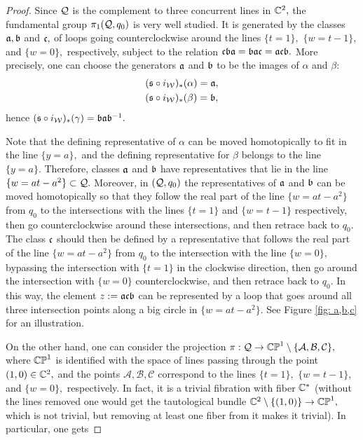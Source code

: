 \documentclass{article}
\begin{document}
\begin{proof}
Since $\mathcal{Q}$ is the complement to three concurrent lines in $\mathbb{C}^2,$ the fundamental group $\pi_1(\mathcal{Q},q_0)$ is very well studied. It is generated by the classes $\mathfrak{a},\mathfrak{b}$ and $\mathfrak{c},$ of loops going counterclockwise around the lines $\{t=1\},$ $\{w=t-1\},$ and $\{w=0\},$ respectively, subject to the relation $\mathfrak{c}\mathfrak{b}\mathfrak{a}=\mathfrak{b}\mathfrak{a}\mathfrak{c}=\mathfrak{a}\mathfrak{c}\mathfrak{b}.$ 
More precisely, one can choose the generators $\mathfrak{a}$ and $\mathfrak{b}$ to be the images of $\alpha$ and $\beta:$
\begin{align*}
&(\mathfrak{s}\circ i_{\mathcal{W}})_*(\alpha)=\mathfrak{a},\\
&(\mathfrak{s}\circ i_{\mathcal{W}})_*(\beta)=\mathfrak{b},\\
\end{align*}
hence $(\mathfrak{s}\circ i_{\mathcal{W}})_*(\gamma)=\mathfrak{b}\mathfrak{a}\mathfrak{b}^{-1}.$

Note that the defining representative of $\alpha$ can be moved homotopically to fit in the line $\{y=a\},$ and the defining representative for $\beta$ belongs to the line $\{y=a\}.$ Therefore, classes $\mathfrak{a}$ and $\mathfrak{b}$ have representatives that lie in the line $\{w=at-a^2\}\subset\mathcal{Q}.$ Moreover, in $(\mathcal{Q},q_0)$ the representatives of $\mathfrak{a}$ and $\mathfrak{b}$ can be moved homotopically so that they follow the real part of the line $\{w=at-a^2\}$ from $q_0$ to the intersections with the lines $\{t=1\}$ and $\{w=t-1\}$ respectively, then go counterclockwise around these intersections, and then retrace back to $q_0.$ The class $\mathfrak{c}$ should then be defined by a representative that follows the real part of the line $\{w=at-a^2\}$ from $q_0$ to the intersection with the line $\{w=0\},$ bypassing the intersection with $\{t=1\}$ in the clockwise direction, then go around the intersection with $\{w=0\}$ counterclockwise, and then retrace back to $q_0.$ In this way, the element $z:=\mathfrak{a}\mathfrak{c}\mathfrak{b}$ can be represented by a loop that goes around all three intersection points along a big circle in $\{w=at-a^2\}.$ See Figure \ref{fig: a,b,c} for an illustration.

On the other hand, one can consider the projection $\pi:\mathcal{Q}\to \mathbb{CP}^1\setminus \{\mathcal{A},\mathcal{B},\mathcal{C}\},$ where $\mathbb{CP}^1$ is identified with the space of lines passing through the point $(1,0)\in\mathbb{C}^2,$ and the points $\mathcal{A},\mathcal{B},\mathcal{C}$ correspond to the lines $\{t=1\},$ $\{w=t-1\},$ and $\{w=0\},$ respectively. In fact, it is a trivial fibration with fiber $\mathbb{C}^*$ (without the lines removed one would get the tautological bundle $\mathbb{C}^2\setminus \{(1,0)\}\to \mathbb{CP}^1,$ which is not trivial, but removing at least one fiber from it makes it trivial). In particular, one gets


\end{proof}
\end{document}
